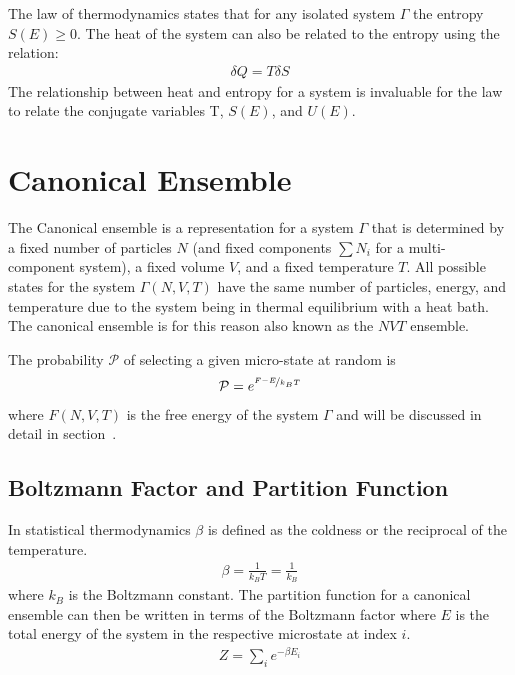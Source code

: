 The  law of thermodynamics states that for any isolated system $\Gamma$ the entropy $S(E) \geq 0$. The heat of the system can also be related to the entropy using the relation:
\begin{align}
    \delta Q = T\delta S
\end{align}
The relationship between heat and entropy for a system is invaluable for the  law to relate the conjugate variables T, $S(E)$, and $U(E)$.

\section{Canonical Ensemble}
The Canonical ensemble is a representation for a system $\Gamma$ that is determined by a fixed number of particles $N$ (and fixed components $\sum N_i$ for a multi-component system), a fixed volume $V$, and a fixed temperature $T$. All possible states for the system $\Gamma\left(N,V,T\right)$ have the same number of particles, energy, and temperature due to the system being in thermal equilibrium with a heat bath.
The canonical ensemble is for this reason also known as the $NVT$ ensemble.

The probability $\mathcal{P}$ of selecting a given micro-state at random is
\begin{align}
    \mathcal{P} = e^{\nicefrac{F-E}{k_BT}}
\end{align}
where $F\left(N,V,T\right)$ is the free energy of the system $\Gamma$ and will be discussed in detail in section~.



\subsection{Boltzmann Factor and Partition Function}
In statistical thermodynamics $\beta$ is defined as the coldness or the reciprocal of the temperature.
\begin{align}
    \beta = \frac{1}{k_BT} = \frac{1}{k_B}
\end{align}
where $k_B$ is the Boltzmann constant. The partition function for a canonical ensemble can then be written in terms of the Boltzmann factor where $E$ is the total energy of the system in the respective microstate at index $i$.
\begin{align}
    Z = \sum_i e^{-\beta E_i}
\end{align}

